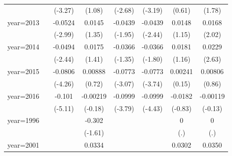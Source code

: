\begin{table}[htbp]
\begin{tabular}{l*{7}{c}}
                    &                     &     (-3.27)         &      (1.08)         &     (-2.68)         &     (-3.19)         &      (0.61)         &      (1.78)         \\
\addlinespace
year=2013           &                     &     -0.0524\sym{**} &      0.0145         &     -0.0439         &     -0.0439\sym{*}  &      0.0148         &      0.0168\sym{*}  \\
                    &                     &     (-2.99)         &      (1.35)         &     (-1.95)         &     (-2.44)         &      (1.15)         &      (2.02)         \\
\addlinespace
year=2014           &                     &     -0.0494\sym{*}  &      0.0175         &     -0.0366         &     -0.0366         &      0.0181         &      0.0229\sym{**} \\
                    &                     &     (-2.44)         &      (1.41)         &     (-1.35)         &     (-1.80)         &      (1.16)         &      (2.63)         \\
\addlinespace
year=2015           &                     &     -0.0806\sym{***}&     0.00888         &     -0.0773\sym{**} &     -0.0773\sym{***}&     0.00241         &     0.00806         \\
                    &                     &     (-4.26)         &      (0.72)         &     (-3.07)         &     (-3.74)         &      (0.15)         &      (0.86)         \\
\addlinespace
year=2016           &                     &      -0.101\sym{***}&    -0.00219         &     -0.0999\sym{***}&     -0.0999\sym{***}&     -0.0182         &    -0.00119         \\
                    &                     &     (-5.11)         &     (-0.18)         &     (-3.79)         &     (-4.43)         &     (-0.83)         &     (-0.13)         \\
\addlinespace
year=1996           &                     &                     &      -0.302         &                     &                     &           0         &           0         \\
                    &                     &                     &     (-1.61)         &                     &                     &         (.)         &         (.)         \\
\addlinespace
year=2001           &                     &                     &      0.0334\sym{***}&                     &                     &      0.0302\sym{***}&      0.0350\sym{***}\\

\end{tabular}
\end{table}
